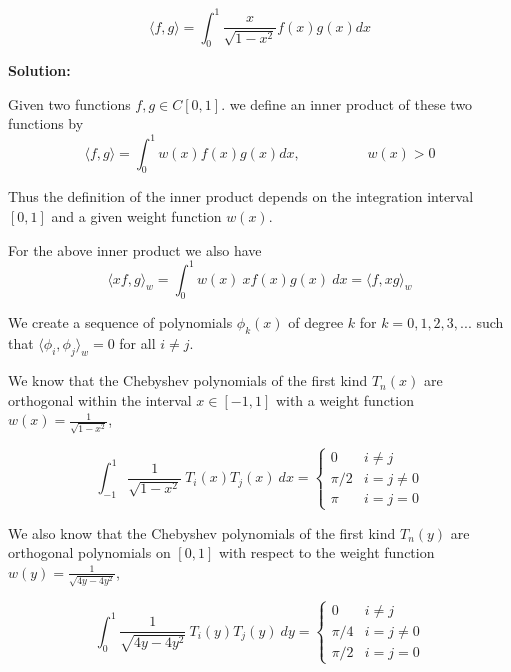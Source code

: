 \documentclass[a4paper,11pt]{report}
\begin{document}
\begin{enumerate}
\begin{itemize}
            \begin{equation*}
            \langle f, g \rangle = \int_{0}^{1} \frac{x}{\sqrt{1 - x^{2}}} f(x) g(x) dx
            \end{equation*}

    \textbf{Solution:}

    Given two functions $f, g \in C[0, 1]$. we define an inner product of these two functions by
    \begin{equation*}
    \langle f, g \rangle = \int_{0}^{1} w(x) f(x) g(x) dx, \hspace{2cm} w(x) > 0
    \end{equation*}
        
    Thus the definition of the inner product depends on the integration interval $[0, 1]$ and a given weight function $w(x)$.

    For the above inner product we also have
    \begin{equation*}
    \langle xf, g \rangle_{w} = \int_{0}^{1} w(x)\ x f(x) g(x)\ dx = \langle f, xg \rangle_{w}
    \end{equation*}

    We create a sequence of polynomials $\phi_{k}(x)$ of degree $k$ for $k = 0, 1, 2, 3, ...$ such that
    $\langle \phi_{i}, \phi_{j} \rangle_{w} = 0$ for all $i \neq j$.

    We know that the Chebyshev polynomials of the first kind $T_{n}(x)$ are orthogonal within the interval $x \in [-1, 1]$ with a weight function 
    $w(x) = \displaystyle \frac{1}{\sqrt{1 - x^{2}}}$,

    \begin{equation*}
    \int_{-1}^{1} \frac{1}{\sqrt{1 - x^2}}\ T_{i}(x) T_{j}(x)\ dx = 
    \begin{cases}
        0 & i \neq j \\
        \pi/2 & i = j \neq 0 \\
        \pi & i = j = 0
    \end{cases}
    \end{equation*}

    We also know that the Chebyshev polynomials of the first kind $T_{n}(y)$ are orthogonal polynomials on $[0,1]$ with respect to the weight function
    $w(y) = \displaystyle \frac{1}{\sqrt{4y - 4y^2}}$,

    \begin{equation*}
    \int_{0}^{1} \frac{1}{\sqrt{4y - 4y^2}}\ T_{i}(y) T_{j}(y)\ dy = 
    \begin{cases}
        0 & i \neq j \\
        \pi/4 & i = j \neq 0 \\
        \pi/2 & i = j = 0
    \end{cases}
    \end{equation*}


\end{itemize}
\end{enumerate}
\end{document}
